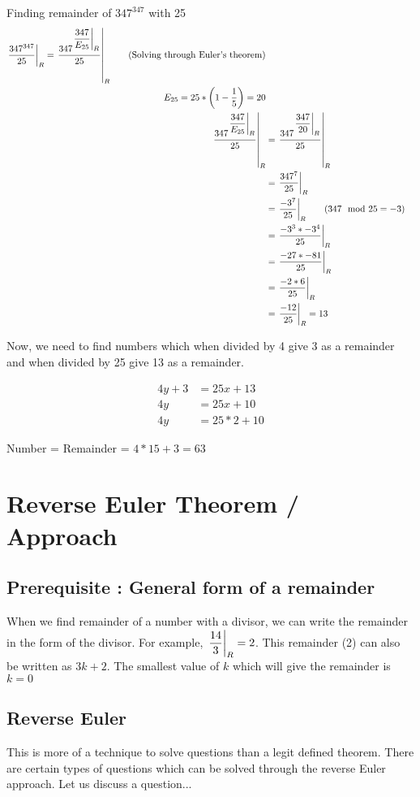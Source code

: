 Finding remainder of $347^{347}$ with 25
\begin{align*}
    \displaystyle{ \left. \frac{347^{347}}{25} \right |_{R} } = \displaystyle{ \left. \frac{347^{ \displaystyle{ \left. \frac{347}{E_{25}} \right |_{R} } }}{25} \right |_{R} } \tag{Solving through Euler's theorem} \\
    E_{25} = 25 * \left ( 1 - \dfrac{1}{5} \right ) = 20 \\
    \displaystyle{ \left. \frac{347^{ \displaystyle{ \left. \frac{347}{E_{25}} \right |_{R} } }}{25} \right |_{R} } &= \displaystyle{ \left. \frac{347^{ \displaystyle{ \left. \frac{347}{20} \right |_{R} } }}{25} \right |_{R} } \\
    &= \displaystyle{ \left. \frac{347^{7}}{25} \right |_{R} } \\
    &= \displaystyle{ \left. \frac{-3^{7}}{25} \right |_{R} } \tag{$347 \mod 25 = -3$} \\
    &= \displaystyle{ \left. \frac{-3^{3} * -3^{4}}{25} \right |_{R} } \\
    &= \displaystyle{ \left. \frac{-27 * -81}{25} \right |_{R} } \\
    &= \displaystyle{ \left. \frac{-2 * 6}{25} \right |_{R} } \\
    &= \displaystyle{ \left. \frac{-12}{25} \right |_{R} } = 13 \\
\end{align*}

Now, we need to find numbers which when divided by 4 give 3 as a remainder and when divided by 25 give 13 as a remainder. 

\begin{align*}
    4y + 3 &= 25x + 13 \\
    4y &= 25x + 10 \\
    4y &= 25*2 + 10 \tag{$x=2 \implies y=15$}
\end{align*}

Number = Remainder = $4*15 + 3 = 63$

\section{Reverse Euler Theorem / Approach} \label{reverse-euler}

\subsection{Prerequisite : General form of a remainder}
When we find remainder of a number with a divisor, we can write the remainder in the form of the divisor. For example, $\displaystyle{ \left. \frac{14}{3} \right |_{R} } = 2$. This remainder (2) can also be written as $3k + 2$. The smallest value of $k$ which will give the remainder is $k = 0$

\subsection{Reverse Euler}

This is more of a technique to solve questions than a legit defined theorem. There are certain types of questions which can be solved through the reverse Euler approach. Let us discuss a question...

